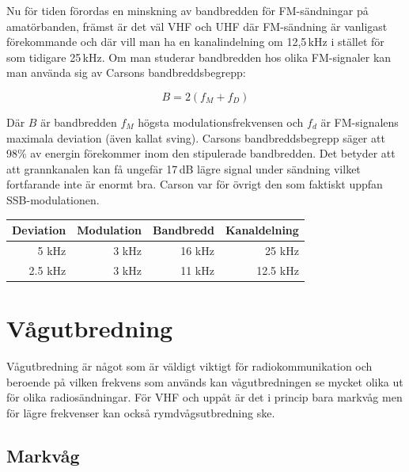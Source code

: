 Nu för tiden förordas en minskning av bandbredden för FM-sändningar på
amatörbanden, främst är det väl VHF och UHF där FM-sändning är vanligast
förekommande och där vill man ha en kanalindelning om 12,5\,kHz i stället för
som tidigare 25\,kHz. Om man studerar bandbredden hos olika FM-signaler kan
man använda sig av Carsons bandbreddsbegrepp:

\begin{equation}
	B=2(f_M+f_D)
\end{equation}

Där $B$ är bandbredden $f_M$ högsta modulationsfrekvensen och $f_d$ är
FM-signalens maximala deviation (även kallat sving). Carsons bandbreddsbegrepp
säger att 98\% av energin förekommer inom den stipulerade bandbredden. Det
betyder att att grannkanalen kan få ungefär 17\,dB lägre signal under sändning
vilket fortfarande inte är enormt bra. Carson var för övrigt den som faktiskt
uppfan SSB-modulationen.

\begin{center}
\begin{tabular}{rrrr}
	Deviation & Modulation & Bandbredd & Kanaldelning \\ \hline
	    5 kHz &      3 kHz &    16 kHz &       25 kHz \\
	  2.5 kHz &      3 kHz &    11 kHz &     12.5 kHz
\end{tabular}
\end{center}









\section{Vågutbredning}
\label{vågutbredning}

Vågutbredning är något som är väldigt viktigt för radiokommunikation och
beroende på vilken frekvens som används kan vågutbredningen se mycket olika ut
för olika radiosändningar. För VHF och uppåt är det i princip bara markvåg men
för lägre frekvenser kan också rymdvågsutbredning ske.

\subsection{Markvåg}

